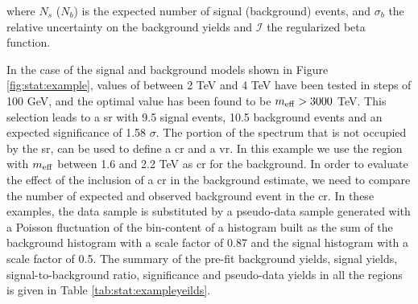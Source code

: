 \noindent where $N_s$ ($N_b$) is the expected number of signal (background) events, and $\sigma_b$ the relative uncertainty on the background yields and $\mathcal{I}$ the regularized beta function. 

In the case of the signal and background models shown in Figure \ref{fig:stat:example}, values of \meff between 2 TeV and 4 TeV have been tested in steps of 100 GeV, and the optimal value has been found to be $m_{\mathrm{eff}} > 3000$ TeV. This selection leads to a \gls{sr} with  9.5 signal events, 10.5 background events and an expected significance of 1.58 $\sigma$. 
The portion of the \meff spectrum that is not occupied by the \gls{sr}, can be used to define a \gls{cr} and a \gls{vr}.
In this example we use the region with $m_{\mathrm{eff}}$ between 1.6 and 2.2 TeV as \gls{cr} for the background. 
In order to evaluate the effect of the inclusion of a \gls{cr} in the background estimate, we need to compare the number of expected and observed background event in the \gls{cr}. 
In these examples, the data sample is substituted by a pseudo-data sample generated with a Poisson fluctuation 
of the bin-content of a histogram built as the sum of the background histogram with a scale factor of 0.87 and the signal histogram with a scale factor of 0.5. The summary of the pre-fit background yields, signal yields, signal-to-background ratio, significance and pseudo-data yields in all the regions is given in Table \ref{tab:stat:exampleyeilds}.


